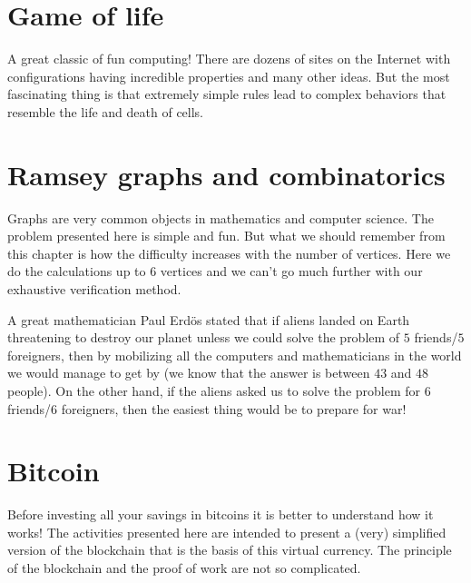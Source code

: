 \documentclass[11pt,class=report,crop=false]{standalone}
\begin{document}
\section{Game of life}

A great classic of fun computing! There are dozens of sites on the Internet with configurations having incredible properties and many other ideas. But the most fascinating thing is that extremely simple rules lead to complex behaviors that resemble the life and death of cells.



\section{Ramsey graphs and combinatorics}

Graphs are very common objects in mathematics and computer science.
The problem presented here is simple and fun. But what we should remember from this chapter is how the difficulty increases with the number of vertices. 
Here we do the calculations up to $6$ vertices and we can't go much further with our exhaustive verification method.


A great mathematician Paul Erd\"os stated that if aliens landed on Earth threatening to destroy our planet unless we could solve the problem of $5$ friends/$5$ foreigners, then by mobilizing all the computers and mathematicians in the world we would manage to get by (we know that the answer is between $43$ and $48$ people). On the other hand, if the aliens asked us to solve the problem for $6$ friends/$6$ foreigners, then the easiest thing would be to prepare for war!


\section{Bitcoin}

Before investing all your savings in bitcoins it is better to understand how it works! The activities presented here are intended to present a (very) simplified version of the blockchain that is the basis of this virtual currency. The principle of the blockchain and the proof of work are not so complicated.

\end{document}

